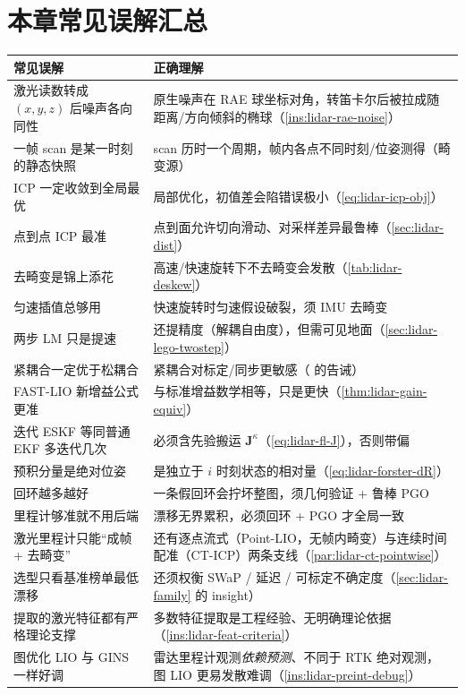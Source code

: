 \section*{本章常见误解汇总}
\begin{table}[H]\centering\small
\begin{tabular}{p{} p{}}
\toprule
\textbf{常见误解} & \textbf{正确理解} \\
\midrule
激光读数转成 $(x,y,z)$ 后噪声各向同性 & 原生噪声在 RAE 球坐标对角，转笛卡尔后被拉成随距离/方向倾斜的椭球（\cref{ins:lidar-rae-noise}）\\
一帧 scan 是某一时刻的静态快照 & scan 历时一个周期，帧内各点不同时刻/位姿测得（畸变源）\\
ICP 一定收敛到全局最优 & 局部优化，初值差会陷错误极小（\cref{eq:lidar-icp-obj}）\\
点到点 ICP 最准 & 点到面允许切向滑动、对采样差异最鲁棒（\cref{sec:lidar-dist}）\\
去畸变是锦上添花 & 高速/快速旋转下不去畸变会发散（\cref{tab:lidar-deskew}）\\
匀速插值总够用 & 快速旋转时匀速假设破裂，须 IMU 去畸变\\
两步 LM 只是提速 & 还提精度（解耦自由度），但需可见地面（\cref{sec:lidar-lego-twostep}）\\
紧耦合一定优于松耦合 & 紧耦合对标定/同步更敏感（\cite{carlone2026handbook} 的告诫）\\
FAST-LIO 新增益公式更准 & 与标准增益数学相等，只是更快（\cref{thm:lidar-gain-equiv}）\\
迭代 ESKF 等同普通 EKF 多迭代几次 & 必须含先验搬运 $\mathbf{J}^\kappa$（\cref{eq:lidar-fl-J}），否则带偏\\
预积分量是绝对位姿 & 是独立于 $i$ 时刻状态的相对量（\cref{eq:lidar-forster-dR}）\\
回环越多越好 & 一条假回环会拧坏整图，须几何验证 + 鲁棒 PGO\\
里程计够准就不用后端 & 漂移无界累积，必须回环 + PGO 才全局一致\\
激光里程计只能“成帧 + 去畸变” & 还有逐点流式（Point-LIO，无帧内畸变）与连续时间配准（CT-ICP）两条支线（\cref{par:lidar-ct-pointwise}）\\
选型只看基准榜单最低漂移 & 还须权衡 SWaP / 延迟 / 可标定不确定度（\cref{sec:lidar-family} 的 insight）\\
提取的激光特征都有严格理论支撑 & 多数特征提取是工程经验、无明确理论依据（\cref{ins:lidar-feat-criteria}）\\
图优化 LIO 与 GINS 一样好调 & 雷达里程计观测\emph{依赖预测}、不同于 RTK 绝对观测，图 LIO 更易发散难调（\cref{ins:lidar-preint-debug}）\\
\bottomrule
\end{tabular}
\end{table}


